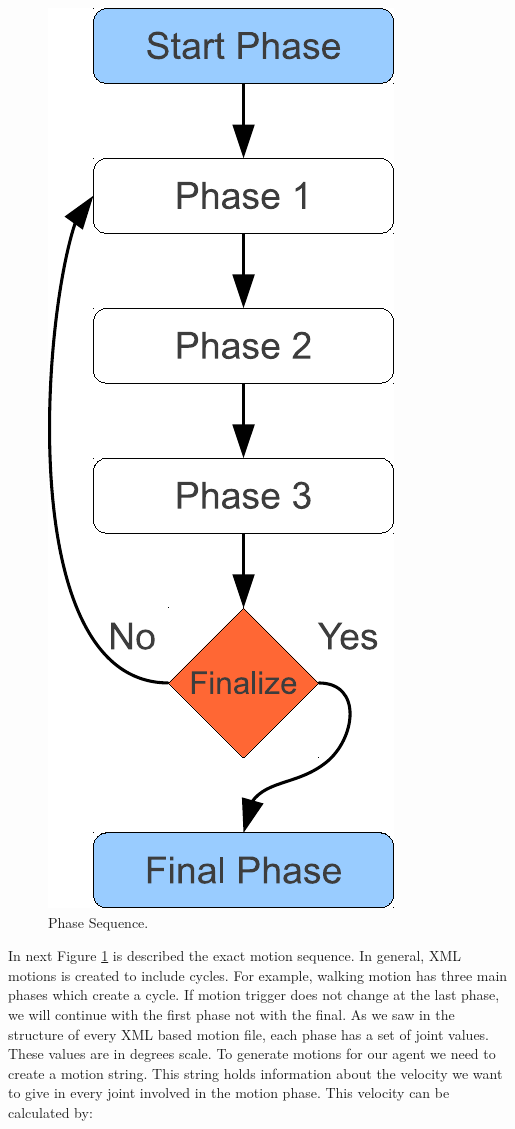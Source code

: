\begin{figure}[htb!]
\centering
  \includegraphics[scale=0.6]{Chapter3/figures/MotionSequence.pdf}
  \caption{Phase Sequence.}
  \label{fig:PhaseSequence}
\end{figure}
In next Figure \ref{fig:PhaseSequence} is described the exact motion sequence. In general, XML motions is created to include cycles. For example, walking motion has three main phases which create a cycle. If motion trigger does not change at the last phase, we will continue with the first phase not with the final. As we saw in the structure of every XML based motion file, each phase has a set of joint values. These values are in degrees scale. To generate motions for our agent we need to create a motion string. This string holds information about the velocity we want to give in every joint involved in the motion phase. This velocity can be calculated by:



